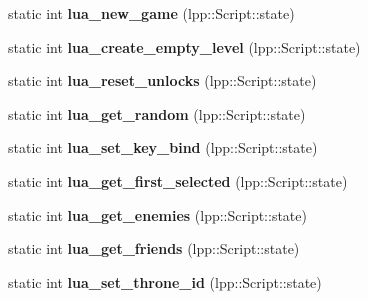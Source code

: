 \begin{DoxyCompactItemize}
\item 
static int {\bfseries lua\+\_\+new\+\_\+game} (lpp\+::\+Script\+::state)\hypertarget{class_lua_interface_a75ef98d36684c3eb6741ebc1f9cf8dec}{}\label{class_lua_interface_a75ef98d36684c3eb6741ebc1f9cf8dec}

\item 
static int {\bfseries lua\+\_\+create\+\_\+empty\+\_\+level} (lpp\+::\+Script\+::state)\hypertarget{class_lua_interface_a32b89eaa09197ca9783b4ba7a7358b0a}{}\label{class_lua_interface_a32b89eaa09197ca9783b4ba7a7358b0a}

\item 
static int {\bfseries lua\+\_\+reset\+\_\+unlocks} (lpp\+::\+Script\+::state)\hypertarget{class_lua_interface_ac3cef8a0fa0e32992f909511ff4ace76}{}\label{class_lua_interface_ac3cef8a0fa0e32992f909511ff4ace76}

\item 
static int {\bfseries lua\+\_\+get\+\_\+random} (lpp\+::\+Script\+::state)\hypertarget{class_lua_interface_af86a3e370385e95f7da5e92996b511f6}{}\label{class_lua_interface_af86a3e370385e95f7da5e92996b511f6}

\item 
static int {\bfseries lua\+\_\+set\+\_\+key\+\_\+bind} (lpp\+::\+Script\+::state)\hypertarget{class_lua_interface_a29eade8a630409d8a905d45613ad154e}{}\label{class_lua_interface_a29eade8a630409d8a905d45613ad154e}

\item 
static int {\bfseries lua\+\_\+get\+\_\+first\+\_\+selected} (lpp\+::\+Script\+::state)\hypertarget{class_lua_interface_a7f95a569cf02e3e8af912f7467792b2e}{}\label{class_lua_interface_a7f95a569cf02e3e8af912f7467792b2e}

\item 
static int {\bfseries lua\+\_\+get\+\_\+enemies} (lpp\+::\+Script\+::state)\hypertarget{class_lua_interface_ad16b0e337997f766ca7bbd1aac579379}{}\label{class_lua_interface_ad16b0e337997f766ca7bbd1aac579379}

\item 
static int {\bfseries lua\+\_\+get\+\_\+friends} (lpp\+::\+Script\+::state)\hypertarget{class_lua_interface_a3a7cae862d7bbd8b50673c64aeb1a351}{}\label{class_lua_interface_a3a7cae862d7bbd8b50673c64aeb1a351}

\item 
static int {\bfseries lua\+\_\+set\+\_\+throne\+\_\+id} (lpp\+::\+Script\+::state)\hypertarget{class_lua_interface_a32c2aa6a6af54e6aa68fccb798b3e74f}{}\label{class_lua_interface_a32c2aa6a6af54e6aa68fccb798b3e74f}


\end{DoxyCompactItemize}
